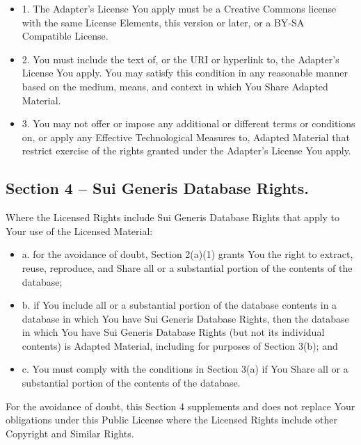 \begin{itemize}
			\begin{itemize}
				\item 1. The Adapter’s License You apply must be a Creative Commons license with the same License Elements, this version or later, or a BY-SA Compatible License.
				\item 2. You must include the text of, or the URI or hyperlink to, the Adapter's License You apply. You may satisfy this condition in any reasonable manner based on the medium, means, and context in which You Share Adapted Material.
				\item 3. You may not offer or impose any additional or different terms or conditions on, or apply any Effective Technological Measures to, Adapted Material that restrict exercise of the rights granted under the Adapter's License You apply.
			\end{itemize}
	\end{itemize}

\subsection*{Section 4 – Sui Generis Database Rights.}

Where the Licensed Rights include Sui Generis Database Rights that apply to Your use of the Licensed Material:
	\begin{itemize}
		\item a. for the avoidance of doubt, Section 2(a)(1) grants You the right to extract, reuse, reproduce, and Share all or a substantial portion of the contents of the database;
		\item b. if You include all or a substantial portion of the database contents in a database in which You have Sui Generis Database Rights, then the database in which You have Sui Generis Database Rights (but not its individual contents) is Adapted Material, including for purposes of Section 3(b); and
		\item c. You must comply with the conditions in Section 3(a) if You Share all or a substantial portion of the contents of the database.
	\end{itemize}
For the avoidance of doubt, this Section 4 supplements and does not replace Your obligations under this Public License where the Licensed Rights include other Copyright and Similar Rights.

